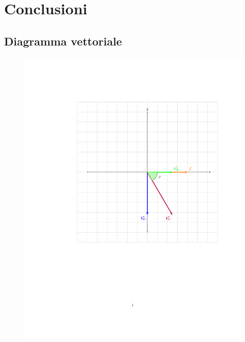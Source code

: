 \documentclass[12pt]{article}
\begin{document}
\section{Conclusioni}
\subsection{Diagramma vettoriale}
\begin{figure}[H]
    \centering
    \includegraphics[scale=0.7]{diagramma-vettoriale.pdf}
\end{figure}
\end{document}

